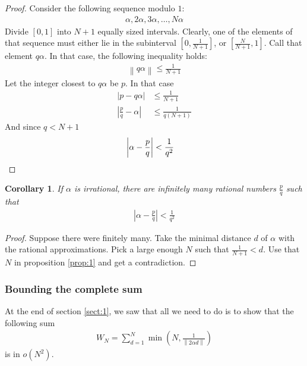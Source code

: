 \documentclass[12pt, titlepage]{article}
\newtheorem{cor}[thm]{Corollary}
\theoremstyle{definition}
\newcommand{\norm}[1]{\left\lVert#1\right\rVert}
\begin{document}
\begin{proof}
    Consider the following sequence modulo $1$:
    \begin{align*}
        \alpha, 2\alpha, 3\alpha, \ldots, N\alpha
    \end{align*}
    Divide $[0,1]$ into $N+1$ equally sized intervals. Clearly, one of the elements of that sequence must either lie in the subinterval $\left[ 0, \frac{1}{N+1} \right]$, or $\left[ \frac{N}{N+1}, 1 \right]$. Call that element $q\alpha$. In that case, the following inequality holds:
    \begin{align*}
        \norm{q\alpha} \leq \frac{1}{N+1}
    \end{align*}
    Let the integer closest to $q\alpha$ be $p$. In that case
    \begin{align*}
        \left| p - q\alpha \right| &\leq \frac{1}{N+1} \\
        \left| \frac{p}{q} - \alpha \right| &\leq \frac{1}{q(N+1)}
    \end{align*}
    And since $q < N+1$
    \begin{align*}
        \left| \alpha - \frac{p}{q} \right| < \frac{1}{q^2} &\qedhere
    \end{align*}
\end{proof}

\begin{cor}
    If $\alpha$ is irrational, there are infinitely many rational numbers $\frac{p}{q}$ such that
    \begin{align*}
        \left| \alpha - \frac{p}{q} \right| < \frac{1}{q^2}
    \end{align*}
\end{cor}

\begin{proof}
    Suppose there were finitely many. Take the minimal distance $d$ of $\alpha$ with the rational approximations. Pick a large enough $N$ such that $\frac{1}{N+1} < d$. Use that $N$ in proposition \ref{prop:1} and get a contradiction.
\end{proof}

\subsubsection{Bounding the complete sum\cite{weyl}}
At the end of section \ref{sect:1}, we saw that all we need to do is to show that the following sum
\begin{align*}
    W_N = \sum_{d=1}^{N} \min\left( N, \frac{1}{\norm{2\alpha d}} \right)
\end{align*}
is in $o(N^2)$.
\end{document}
